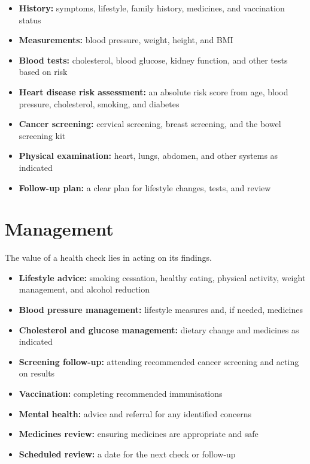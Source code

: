 \begin{itemize}
    \item \textbf{History:} symptoms, lifestyle, family history, medicines, and vaccination status
    \item \textbf{Measurements:} blood pressure, weight, height, and BMI
    \item \textbf{Blood tests:} cholesterol, blood glucose, kidney function, and other tests based on risk
    \item \textbf{Heart disease risk assessment:} an absolute risk score from age, blood pressure, cholesterol, smoking, and diabetes
    \item \textbf{Cancer screening:} cervical screening, breast screening, and the bowel screening kit
    \item \textbf{Physical examination:} heart, lungs, abdomen, and other systems as indicated
    \item \textbf{Follow-up plan:} a clear plan for lifestyle changes, tests, and review
\end{itemize}

\section*{Management}
The value of a health check lies in acting on its findings.

\begin{itemize}
    \item \textbf{Lifestyle advice:} smoking cessation, healthy eating, physical activity, weight management, and alcohol reduction
    \item \textbf{Blood pressure management:} lifestyle measures and, if needed, medicines
    \item \textbf{Cholesterol and glucose management:} dietary change and medicines as indicated
    \item \textbf{Screening follow-up:} attending recommended cancer screening and acting on results
    \item \textbf{Vaccination:} completing recommended immunisations
    \item \textbf{Mental health:} advice and referral for any identified concerns
    \item \textbf{Medicines review:} ensuring medicines are appropriate and safe
    \item \textbf{Scheduled review:} a date for the next check or follow-up
\end{itemize}

